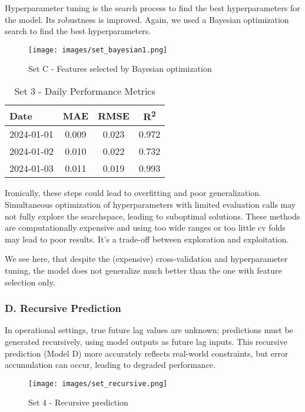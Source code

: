 Hyperparameter tuning is the search process to find the best hyperparameters for the model.
Its robustness is improved. Again, we used a Bayesian optimization search to find the 
best hyperparameters.

\begin{figure}[H]
    \centering
    \texttt{[image: images/set\_bayesian1.png]}
    \caption{Set C - Features selected by Bayesian optimization}
    \label{fig:set3-forecast-profile}
\end{figure}

\begin{table}[H]
    \centering
    \caption{Set 3 - Daily Performance Metrics}
    \begin{tabular}{lccc}
        Date        & MAE    & RMSE   & R\textsuperscript{2} \\
        \hline
        2024-01-01  & 0.009  & 0.023  & 0.972 \\
        2024-01-02  & 0.010  & 0.022  & 0.732 \\
        2024-01-03  & 0.011  & 0.019  & 0.993 \\
    \end{tabular}
\end{table}

Ironically, these steps could lead to overfitting and poor generalization. 
Simultaneous optimization of hyperparameters with limited evaluation 
calls may not fully explore the searchspace, leading to suboptimal solutions. 
These methods are computationally expensive and using too wide ranges or too 
little cv folds may lead to poor results. It's a trade-off between exploration and 
exploitation. 

We see here, that despite the (expensive) cross-validation and hyperparameter tuning, 
the model does not generalize much better than the one with feature selection only. 

\subsubsection*{D. Recursive Prediction}
In operational settings, true future lag values are unknown; predictions must be generated recursively, 
using model outputs as future lag inputs. This recursive prediction (Model D) more accurately reflects 
real-world constraints, but error accumulation can occur, leading to degraded performance.

\begin{figure}[H]
    \centering
    \texttt{[image: images/set\_recursive.png]}
    \caption{Set 4 - Recursive prediction}
    \label{fig:set4-forecast-profile}
\end{figure}

